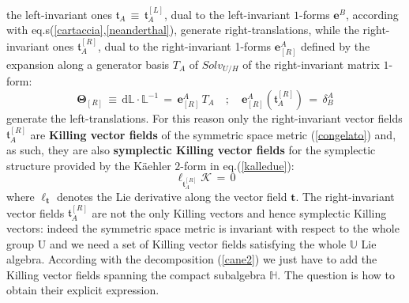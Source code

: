 \documentclass[10pt,a4paper]{article}
\begin{document}
the left-invariant ones $\boldsymbol{\mathfrak{t}}_A\, \equiv \,\boldsymbol{\mathfrak{t}}^{[L]}_A$, dual to the left-invariant $1$-forms $\mathbf{e}^B$, according with eq.s(\ref{cartaccia},\ref{neanderthal}), generate right-translations, while the right-invariant ones $\boldsymbol{\mathfrak{t}}^{[R]}_A$, dual to the right-invariant 1-forms $\mathbf{e}_{[R]}^A$ defined by the expansion along a generator basis $T_A$ of $Solv_{U/H}$ of the right-invariant matrix $1$-form:
\begin{equation}\label{contaminazia}
  \boldsymbol{\Theta}_{[R]} \, \equiv \,  \mathrm{d}\mathbb{L}\cdot \mathbb{L}^{-1} \, = \, \mathbf{e}_{[R]}^A \, T_A \quad ; \quad \mathbf{e}_{[R]}^A\left(\boldsymbol{\mathfrak{t}}^{[R]}_A\right) \, = \, \delta^A_B
 \end{equation}
 generate the left-translations. For this reason only the right-invariant vector fields $\boldsymbol{\mathfrak{t}}^{[R]}_A$ are \textbf{Killing vector fields} of the symmetric space metric (\ref{congelato})
 and, as such, they are also \textbf{symplectic Killing vector fields} for the symplectic structure provided by the K\"aehler
 $2$-form in eq.(\ref{kalledue}):
 \begin{equation}\label{liuvillico}
   \ell_{\mathfrak{t}^{[R]}_A} \boldsymbol{\mathcal{K}} \, = \,0
 \end{equation}
where $\ell_\mathbf{t} $ denotes the Lie derivative along the vector field $\mathbf{t}$. The right-invariant vector fields $\mathfrak{t}^{[R]}_A$ are not the only Killing vectors and hence symplectic Killing vectors: indeed
the symmetric space metric is invariant with respect to the whole group $\mathrm{U}$ and we need
a set of Killing vector fields satisfying the whole $\mathbb{U}$ Lie algebra. According with the decomposition (\ref{cane2}) we just have to add the Killing vector fields spanning the compact subalgebra $\mathbb{H}$. The question is how to obtain their explicit expression.
\end{document}
